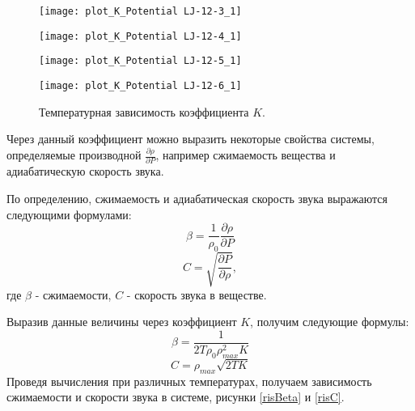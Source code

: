 \begin{figure}[htbp!]
\begin{center}
\begin{minipage}[h]{0.45\linewidth}
\texttt{[image: plot\_K\_Potential LJ-12-3\_1]}
\end{minipage}
\begin{minipage}[h]{0.45\linewidth}
\texttt{[image: plot\_K\_Potential LJ-12-4\_1]}
\end{minipage}

\begin{minipage}[h]{0.45\linewidth}
\texttt{[image: plot\_K\_Potential LJ-12-5\_1]}
\end{minipage}
\begin{minipage}[h]{0.45\linewidth}
\texttt{[image: plot\_K\_Potential LJ-12-6\_1]}
\end{minipage}
\caption{Температурная зависимость коэффициента $K$.}
\label{risK}
\end{center}
\end{figure}

Через данный коэффициент можно выразить некоторые свойства системы, определяемые производной $\frac{\partial \rho}{\partial P}$, например сжимаемость вещества и адиабатическую скорость звука.

По определению, сжимаемость и адиабатическая скорость звука выражаются следующими формулами:
\begin{equation}
\beta = \frac{1}{\rho_0} \frac{\partial \rho}{\partial P}
\label{eqBetaClassic}
\end{equation}
\begin{equation}
C = \sqrt{\frac{\partial P}{\partial \rho}},
\label{eqCClassic}
\end{equation}
где $\beta$ - сжимаемости, $C$ - скорость звука в веществе.

Выразив данные величины через коэффициент $K$, получим следующие формулы:
\begin{equation}
\beta = \frac{1}{2T\rho_0\rho_{max}^2K}
\label{eqBeta}
\end{equation}
\begin{equation}
C = \rho_{max}\sqrt{2TK}
\label{eqC}
\end{equation}
Проведя вычисления при различных температурах, получаем зависимость сжимаемости и скорости звука в системе, рисунки \ref{risBeta} и \ref{risC}.

